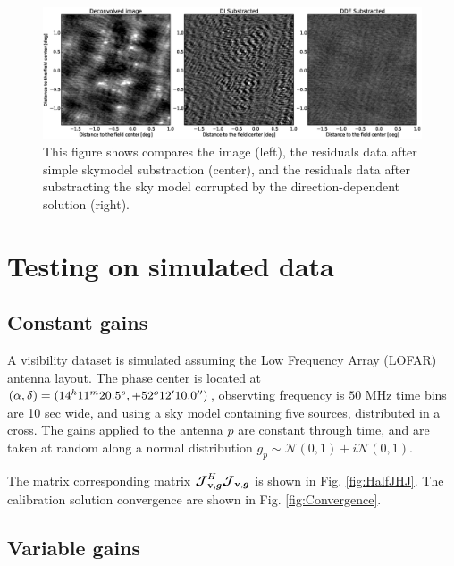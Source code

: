 
\begin{figure}
\begin{center}
\includegraphics[width=\textwidth]{residSimZoom2.eps}
\caption{\label{fig:resid} This figure shows compares the image
  (left), the residuals data after simple skymodel substraction
  (center), and the residuals data after substracting the
  sky model corrupted by the direction-dependent solution (right).}
\end{center}
\end{figure}


\section{Testing \COH on simulated data}

\subsection{Constant gains}
\label{sec:SimpleSimul}

A visibility dataset is simulated assuming the Low Frequency Array (LOFAR) antenna
layout. The phase center is located at
$(\alpha,\delta)=(14^h11^m20.5^s, +52^{o}12\hbox{$^\prime$}10.0\hbox{$^{\prime\prime}$})$,
observting frequency is $50$ MHz time
bins are 10 sec wide, and using a sky model containing five
sources, distributed in a cross. The gains applied to the antenna $p$ are
constant through time, and are taken at random along a normal distribution
$g_{p}\sim\mathcal{N}\left(0,1\right)+i\mathcal{N}\left(0,1\right)$.

The matrix corresponding matrix $\bm{\mathcal{J}}_{\textbf{v},\bm{g}}^H\bm{\mathcal{J}}_{\textbf{v},\bm{g}}$ is shown in
Fig. \ref{fig:HalfJHJ}. The calibration solution convergence are shown
in Fig. \ref{fig:Convergence}.



\subsection{Variable gains}
\label{sec:VarSimul}

